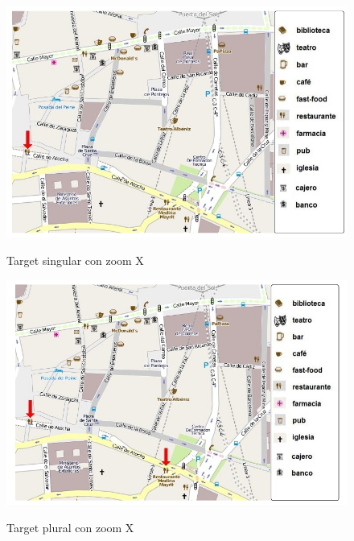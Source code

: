 \begin{figure}
\centering
\includegraphics[width=\textwidth]{figures/rest-singular.png}\\[0pt]
\vspace*{.1cm}
\caption{Target singular con zoom X}
\label{rest-singular}
\end{figure}

\begin{figure}
\centering
\includegraphics[width=\textwidth]{figures/rest-plural.png}\\[0pt]
\vspace*{.1cm}
\caption{Target plural con zoom X}
\label{rest-plural}
\end{figure}


